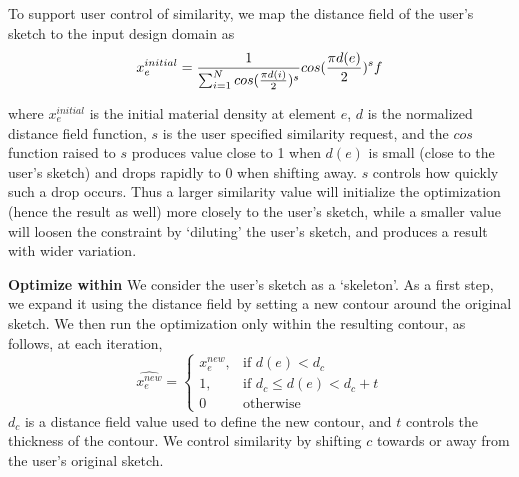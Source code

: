 %
To support user control of similarity,  we map the distance field of the user's sketch to the input design domain as 
\begin{equation}
x_e^{initial} = {1\over \sum_{i=1}^N{cos({{\pi d(i)}\over 2})^s} }cos({{\pi d(e)}\over 2})^s f
\end{equation}

where $x_e^{initial}$ is the initial material density at element $e$, $d$ is the normalized distance field function, $s$ is the user specified similarity request, and the $cos$ function raised to $s$ produces value close to 1 when $d(e)$ is small (close to the user's sketch) and drops rapidly to 0 when shifting away. $s$ controls how quickly such a drop occurs. Thus a larger similarity value will initialize the optimization (hence the result as well) more closely to the user's sketch, while a smaller value will loosen the constraint by `diluting' the user's sketch, and produces a result with wider variation.


\textbf{Optimize within}
We consider the user's sketch as a `skeleton'. As a first step, we expand it using the distance field by setting a new contour around the original sketch. We then run the optimization only within the resulting contour, as follows, at each iteration,
\begin{equation}
    \widehat {x_e^{new}}= 
\begin{cases}
    x_e^{new},	& \text{if } d(e) < d_c\\
    1,              		& \text{if } d_c \leq d(e) < d_c + t\\
    0 						& \text{otherwise}
\end{cases}
\end{equation}
$d_c$ is a distance field value used to define the new contour, and $t$ controls the thickness of the contour. We control similarity by shifting $c$ towards or away from the user's original sketch.

